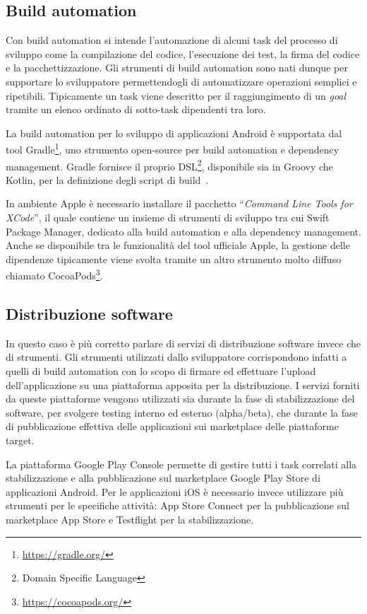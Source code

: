 \subsection*{Build automation}
Con build automation si intende l'automazione di alcuni task del processo di sviluppo come la compilazione del codice, 
l'esecuzione dei test, 
la firma del codice e la pacchettizzazione. 
Gli strumenti di build automation sono nati dunque per supportare lo sviluppatore permettendogli di automatizzare operazioni semplici e ripetibili. 
Tipicamente un task viene descritto per il raggiungimento di un \textit{goal} tramite un elenco ordinato di sotto-task dipendenti tra loro.

La build automation per lo sviluppo di applicazioni Android è supportata dal tool Gradle\footnote{\href{https://gradle.org/}{https://gradle.org/}}, 
uno strumento open-source per build automation e dependency management. 
Gradle fornisce il proprio DSL\footnote{Domain Specific Language}, 
disponibile sia in Groovy che Kotlin, 
per la definizione degli script di build~\cite{nagy2022simplifying}.

In ambiente Apple è necessario installare il pacchetto ``\textit{Command Line Tools for XCode}'', il quale contiene un insieme di strumenti di sviluppo tra cui Swift Package Manager, dedicato alla build automation e alla dependency management. Anche se disponibile tra le funzionalità del tool ufficiale Apple, la gestione delle dipendenze tipicamente viene svolta tramite un altro strumento molto diffuso chiamato CocoaPods\footnote{\href{https://cocoapods.org/}{https://cocoapods.org/}}.

\subsection*{Distribuzione software}
In questo caso è più corretto parlare di servizi di distribuzione software invece che di strumenti. 
Gli strumenti utilizzati dallo sviluppatore corrispondono infatti a quelli di build automation con lo scopo di firmare ed effettuare l'upload dell'applicazione su una piattaforma apposita per la distribuzione. 
I servizi forniti da queste piattaforme vengono utilizzati sia durante la fase di stabilizzazione del software, 
per svolgere testing interno ed esterno (alpha/beta), 
che durante la fase di pubblicazione effettiva delle applicazioni sui marketplace delle piattaforme target.

La piattaforma Google Play Console permette di gestire tutti i task correlati alla stabilizzazione e alla pubblicazione sul marketplace Google Play Store di applicazioni Android. 
Per le applicazioni iOS è necessario invece utilizzare più strumenti per le specifiche attività: 
App Store Connect per la pubblicazione sul marketplace App Store e Testflight per la stabilizzazione.

